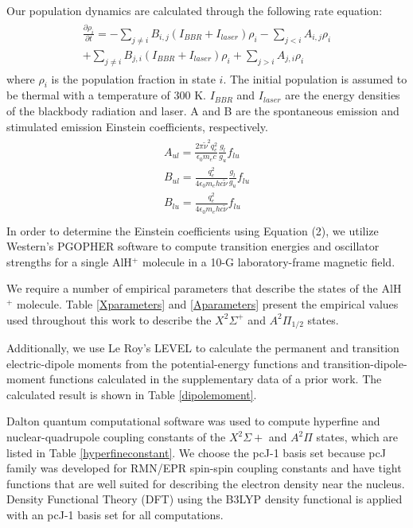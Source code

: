 \documentclass[nofootinbib,aip,jcp,reprint]{revtex4-1}
\begin{document}
Our population dynamics are calculated through the following rate equation:
\begin{align}
\begin{aligned}
\frac{\partial\rho_i}{\partial t}=-\sum_{j\neq i}B_{i,j}(I_{BBR}+I_{laser})\rho_i - \sum_{j<i}A_{i,j}\rho_i \\
+\sum_{j\neq i}B_{j,i}(I_{BBR}+I_{laser})\rho_i + \sum_{j>i}A_{j,i}\rho_i 
\end{aligned}
\end{align}
where $\rho_i$ is the population fraction in state $i$. The initial population is assumed to be thermal with a temperature of 300 K. $I_{BBR}$ and $I_{laser}$ are the energy densities of the blackbody radiation and laser. A and B are the spontaneous emission and stimulated emission Einstein coefficients, respectively.
\begin{align}
\begin{aligned}
A_{ul} = \frac{2\pi \widetilde{\nu}^2 q_e^2}{\epsilon_0 m_e c} \frac{g_l}{g_u} f_{lu}\\
B_{ul} = \frac{q_e^2}{4 \epsilon_0 m_e h c \widetilde{\nu}} \frac{g_l}{g_u} f_{lu} \\
B_{lu} = \frac{q_e^2}{4 \epsilon_0 m_e h c \widetilde{\nu}} f_{lu}\\
\end{aligned}
\end{align}
In order to determine the Einstein coefficients using Equation (2), we utilize Western's PGOPHER\cite{western2017pgopher} software to compute transition energies and oscillator strengths for a single AlH$^+$ molecule in a 10-G laboratory-frame magnetic field. 

We require a number of empirical parameters that describe the states of the AlH$^+$ molecule. Table \ref{Xparameters} and \ref{Aparameters} present the empirical values used throughout this work to describe the $X^2 \Sigma^{+}$  and $A^2\Pi_{1/2}$ states.

Additionally, we use Le Roy's LEVEL\cite{le2017level} to calculate the permanent and transition electric-dipole moments from the potential-energy functions and transition-dipole-moment functions calculated in the supplementary data of a prior work\cite{nguyen2011challenges}. The calculated result is shown in Table \ref{dipolemoment}.

Dalton\cite{daltonpaper, daltonwebpage} quantum computational software was used to compute hyperfine and nuclear-quadrupole coupling constants of the $X^2\Sigma+$ and $A^2\Pi$ states, which are listed in Table \ref{hyperfineconstant}. We choose the pcJ-1 basis set because pcJ family was developed for RMN/EPR spin-spin coupling constants and have tight functions that are well suited for describing the electron density near the nucleus. Density Functional Theory (DFT) using the B3LYP density functional is applied with an pcJ-1 basis set for all computations.
\end{document}
